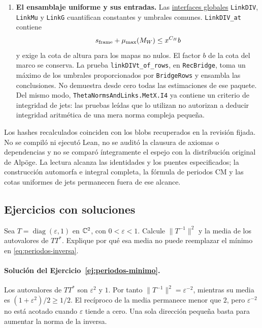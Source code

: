 \begin{enumerate}
\item \textbf{El ensamblaje uniforme y sus entradas.}
Las
\href{https://github.com/CocoSgt/riemann-hypothesis-lean/blob/7cbf7a0c32fca1badf05931879a37c3f8a2b03b4/src/Formalism/SharpRestriction/GlobalTheoremInputs.lean}{interfaces globales}
\texttt{LinkDIV}, \texttt{LinkMu} y \texttt{LinkG} cuantifican
constantes y umbrales comunes. \texttt{LinkDIV\_at} contiene
\[
 s_{\rm frame}+\mu_{\max}(M_W)\le x^{C_H}b
\]
y exige la cota de altura para los mapas no nulos. El factor $b$
de la cota del marco se conserva. La prueba
\texttt{linkDIVt\_of\_rows}, en \texttt{RecBridge}, toma un
máximo de los umbrales proporcionados por \texttt{BridgeRows} y
ensambla las conclusiones. No demuestra desde cero todas las
estimaciones de ese paquete. Del mismo modo,
\texttt{ThetaNormsAndLinks.MetX.I4} ya contiene un criterio de
integridad de jets: las pruebas leídas que lo utilizan no autorizan
a deducir integridad aritmética de una mera norma compleja pequeña.
\end{enumerate}

Los hashes recalculados coinciden con los blobs recuperados en la
revisión fijada. No se compiló ni ejecutó Lean, no se auditó la
clausura de axiomas o dependencias y no se comparó íntegramente el
espejo con la distribución original de Alpöge. La lectura alcanza
las identidades y los puentes especificados; la construcción
automorfa e integral completa, la fórmula de periodos CM y las
cotas uniformes de jets permanecen fuera de ese alcance.

\subsection{Ejercicios con soluciones}

\begin{ejercicio}\label{ej:periodos-minimo}
Sea $T=\operatorname{diag}(\varepsilon,1)$ en $\mathbb{C}^2$, con
$0<\varepsilon<1$. Calcule $\|T^{-1}\|^2$ y la media de los
autovalores de $TT^*$. Explique por qué esa media no puede reemplazar
el mínimo en \eqref{eq:periodos-inversa}.
\end{ejercicio}

\paragraph{Solución del Ejercicio~\ref{ej:periodos-minimo}.}
Los autovalores de $TT^*$ son $\varepsilon^2$ y $1$.
Por tanto $\|T^{-1}\|^2=\varepsilon^{-2}$, mientras su media es
$(1+\varepsilon^2)/2\ge1/2$. El recíproco de la media permanece
menor que $2$, pero $\varepsilon^{-2}$ no está acotado cuando
$\varepsilon$ tiende a cero. Una sola dirección pequeña basta
para aumentar la norma de la inversa.

